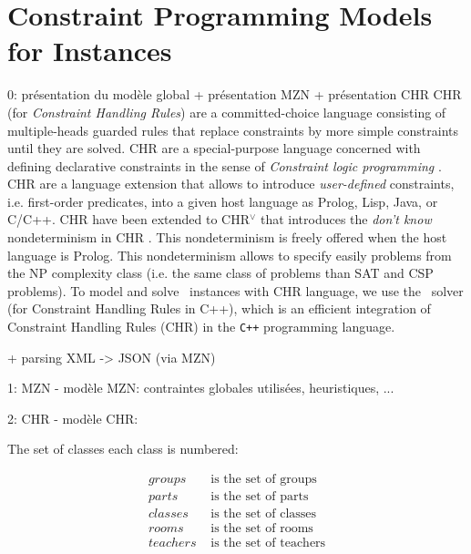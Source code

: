 \section{Constraint Programming Models for {\UTP} Instances}
\label{sec:model}

0: présentation du modèle global
+ présentation MZN
+ présentation CHR
CHR (for {\it Constraint Handling Rules}) \cite{Fruhwirth_TechReport_92,Fruhwirth_CP_94,Fruhwirth_JLP_98,Fruhwirth_CHR_09,Fruhwirth_Abdennadher_CHR_03,Fruhwirth_Raiser_2011} are a committed-choice language consisting of multiple-heads guarded rules that replace constraints by more  simple constraints until they are solved.
CHR are a special-purpose language concerned with defining declarative constraints in the sense of {\it Constraint logic programming} \cite{VanHentenryck_ker_91,Jaffar_Lassez_POPL_87,Jaffar_Malher_JLP_94}.
CHR are a language extension that allows to introduce {\it user-defined} constraints, i.e. first-order predicates, into a given host language as Prolog, Lisp, Java, or C/C++.
CHR have been extended to CHR\ensuremath{^{\vee}} \cite{Abdennadher_Schutz_FQAS_98} that introduces the \emph{don't know} nondeterminism in CHR \cite{Betz_Fruhwirth_TCL_13}.
This nondeterminism is freely offered when the host language is Prolog.
This nondeterminism allows to specify easily problems from the NP complexity class (i.e. the same class of problems than SAT and CSP problems). To model and solve \UTP\ instances with CHR language, we use the \CHRPP\ solver\cite{barichard_stephan_2019} (for Constraint Handling Rules in C++), which is an efficient integration of Constraint Handling Rules (CHR) in the \texttt{C++} programming language.

+ parsing XML -> JSON (via MZN)

1: MZN
- modèle MZN: contraintes globales utilisées, heuristiques, ...

2: CHR
- modèle CHR: 

The set of classes each class is numbered:

$$
\begin{array}{rl}
groups & \mbox{ is the set of groups} \\
parts & \mbox{ is the set of parts} \\
classes & \mbox{ is the set of classes} \\
rooms & \mbox{ is the set of rooms} \\
teachers & \mbox{ is the set of teachers} \\
\end{array}
$$

